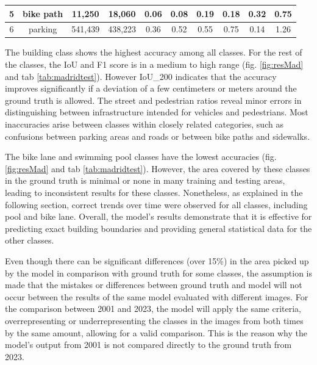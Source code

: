 \begin{refsection}
\begin{table}[!htb]
\begin{tabular}{|c|c|c|c|c|c|c|c|c|c|}
5                                                            & bike path           & 11,250                                                       & 18,060         & 0.06         & 0.08              & 0.19        & 0.18                                                             & 0.32                                                                 & 0.75                                    \\ \hline
6                                                            & parking             & 541,439                                                      & 438,223        & 0.36         & 0.52              & 0.55        & 0.75                                                             & 0.14                                                                 & 1.26                                    \\ \hline
\end{tabular}
\end{table}


The building class shows the highest accuracy among all classes. For the rest of the classes, the IoU and F1 score is in a medium to high range (fig. \ref{fig:resMad} and tab \ref{tab:madridtest}). However IoU\_200 indicates that the accuracy improves significantly if a deviation of a few centimeters or meters around the ground truth is allowed. The street and pedestrian ratios reveal minor errors in distinguishing between infrastructure intended for vehicles and pedestrians. Most inaccuracies arise between classes within closely related categories, such as confusions between parking areas and roads or between bike paths and sidewalks. 

The bike lane and swimming pool classes have the lowest accuracies (fig. \ref{fig:resMad} and tab \ref{tab:madridtest}). However, the area covered by these classes in the ground truth is minimal or none in many training and testing areas, leading to inconsistent results for these classes. Nonetheless, as explained in the following section, correct trends over time were observed for all classes, including pool and bike lane. Overall, the model's results demonstrate that it is effective for predicting exact building boundaries and providing general statistical data for the other classes.

Even though there can be significant differences (over 15\%) in the area picked up by the model in comparison with ground truth for some classes, the assumption is made that the mistakes or differences between ground truth and model will not occur between the results of the same model evaluated with different images. For the comparison between 2001 and 2023, the model will apply the same criteria, overrepresenting or underrepresenting the classes in the images from both times by the same amount, allowing for a valid comparison. This is the reason why the model's output from 2001 is not compared directly to the ground truth from 2023.


\end{refsection}
